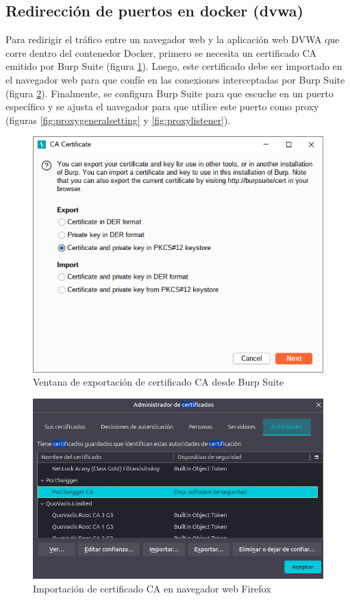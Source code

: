 \documentclass[letterpaper,12pt]{article}
\let\origsubsection\subsection
\renewcommand{\subsection}{\FloatBarrier\origsubsection}
\begin{document}
\subsection{Redirección de puertos en docker (dvwa)}
Para redirigir el tráfico entre un navegador web y la aplicación web DVWA que corre dentro del contenedor Docker, primero se necesita un certificado CA emitido por Burp Suite (figura \ref{fig:certificateburp}). Luego, este certificado debe ser importado en el navegador web para que confíe en las conexiones interceptadas por Burp Suite (figura \ref{fig:certificate}). Finalmente, se configura Burp Suite para que escuche en un puerto específico y se ajusta el navegador para que utilice este puerto como proxy (figuras \ref{fig:proxygeneralsetting} y \ref{fig:proxylistener}).
\begin{figure}
    \centering
    \includegraphics[width=1\linewidth]{levanteyredireccione/Captura desde 2025-10-01 22-50-08.png}
    \caption{Ventana de exportación de certificado CA desde Burp Suite}
    \label{fig:certificateburp}
\end{figure}
\begin{figure}
    \centering
    \includegraphics[width=1\linewidth]{levanteyredireccione/Captura desde 2025-10-01 22-52-57.png}
    \caption{Importación de certificado CA en navegador web Firefox}
    \label{fig:certificate}
\end{figure}
\end{document}
